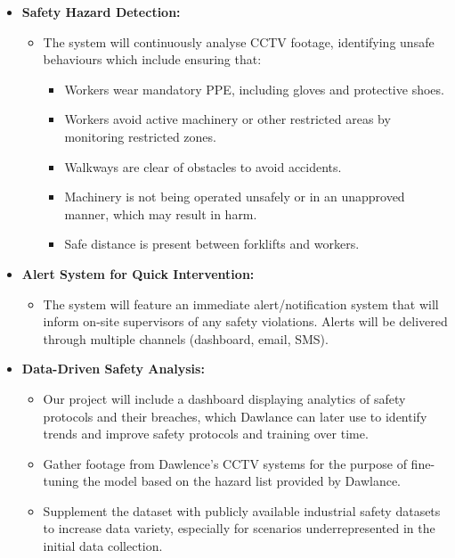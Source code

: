 \documentclass[12pt]{article}
\begin{document}
\begin{itemize}
    \item \textbf{Safety Hazard Detection:} 
    \begin{itemize}
        \item The system will continuously analyse CCTV footage, identifying unsafe behaviours which include ensuring that:
        \begin{itemize}
            \item Workers wear mandatory PPE, including gloves and protective shoes.
            \item Workers avoid active machinery or other restricted areas by monitoring restricted zones.
            \item Walkways are clear of obstacles to avoid accidents.
            \item Machinery is not being operated unsafely or in an unapproved manner, which may result in harm.
            \item Safe distance is present between forklifts and workers.
        \end{itemize}
    \end{itemize}

    \item \textbf{Alert System for Quick Intervention:} 
    \begin{itemize}
        \item The system will feature an immediate alert/notification system that will inform on-site supervisors of any safety violations. Alerts will be delivered through multiple channels (dashboard, email, SMS).
    \end{itemize}
    
    \item \textbf{Data-Driven Safety Analysis:}
    \begin{itemize}
        \item Our project will include a dashboard displaying analytics of safety protocols and their breaches, which Dawlance can later use to identify trends and improve safety protocols and training over time.
        \item Gather footage from Dawlence's CCTV systems for the purpose of fine-tuning the model based on the hazard list provided by Dawlance.
        \item Supplement the dataset with publicly available industrial safety datasets to increase data variety, especially for scenarios underrepresented in the initial data collection.
    \end{itemize}
\end{itemize}
\end{document}
